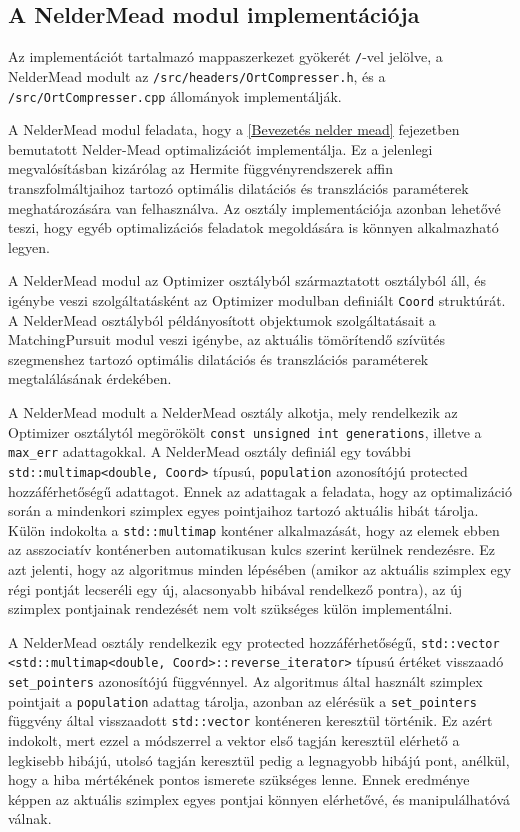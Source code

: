 \documentclass[oneside,titlepage,12pt,a4paper]{report}
\begin{document}
\subsection{A NelderMead modul implementációja}

Az implementációt tartalmazó mappaszerkezet gyökerét \texttt{/}-vel jelölve, a NelderMead modult  az \texttt{/src/headers/OrtCompresser.h}, és a \texttt{/src/OrtCompresser.cpp} állományok implementálják.
\par A NelderMead modul feladata, hogy a \ref{Bevezetés nelder mead} fejezetben bemutatott Nelder-Mead optimalizációt implementálja. Ez a jelenlegi megvalósításban kizárólag az Hermite függvényrendszerek affin transzfolmáltjaihoz tartozó optimális dilatációs és transzlációs paraméterek meghatározására van felhasználva. Az osztály implementációja azonban lehetővé teszi, hogy egyéb optimalizációs feladatok megoldására is könnyen alkalmazható legyen.
\par A NelderMead modul az Optimizer osztályból származtatott osztályból áll, és igénybe veszi szolgáltatásként az Optimizer modulban definiált \texttt{Coord} struktúrát. A NelderMead osztályból példányosított objektumok szolgáltatásait a MatchingPursuit modul veszi igénybe, az aktuális tömörítendő szívütés szegmenshez tartozó optimális dilatációs és transzlációs paraméterek megtalálásának érdekében.
\par A NelderMead modult a NelderMead osztály alkotja, mely rendelkezik az Optimizer osztálytól megörökölt \texttt{const unsigned int generations}, illetve a \texttt{max\_err} adattagokkal. A NelderMead osztály definiál egy további \texttt{std::multimap<double, Coord>} típusú, \texttt{population} azonosítójú protected hozzáférhetőségű adattagot. Ennek az adattagak a feladata, hogy az optimalizáció során a mindenkori szimplex egyes pointjaihoz tartozó aktuális hibát tárolja. Külön indokolta a \texttt{std::multimap} konténer alkalmazását, hogy az elemek ebben az asszociatív konténerben automatikusan kulcs szerint kerülnek rendezésre. Ez azt jelenti, hogy az algoritmus minden lépésében (amikor az aktuális szimplex egy régi pontját lecseréli egy új, alacsonyabb hibával rendelkező pontra), az új szimplex pontjainak rendezését nem volt szükséges külön implementálni. 
\par A NelderMead osztály rendelkezik egy protected hozzáférhetőségű, \texttt{std::vector} \texttt{<std::multimap<double, Coord>::reverse\_iterator>} típusú értéket visszaadó \linebreak \texttt{set\_pointers} azonosítójú függvénnyel. Az algoritmus által használt szimplex pointjait a \texttt{population} adattag tárolja, azonban az elérésük a \texttt{set\_pointers} függvény által visszaadott \texttt{std::vector} konténeren keresztül történik. Ez azért indokolt, mert ezzel a módszerrel a vektor első tagján keresztül elérhető a legkisebb hibájú, utolsó tagján keresztül pedig a legnagyobb hibájú pont, anélkül, hogy a hiba mértékének pontos ismerete szükséges lenne. Ennek eredménye képpen az aktuális szimplex egyes pontjai könnyen elérhetővé, és manipulálhatóvá válnak. 
\end{document}
